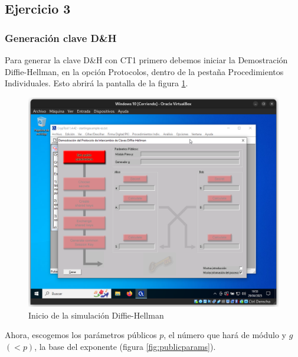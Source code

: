 \subsection{Ejercicio 3}
\graphicspath{ {img/03} }

\subsubsection{Generación clave D\&H}

Para generar la clave D\&H con CT1 primero debemos iniciar la Demostración Diffie-Hellman, en la opción Protocolos, dentro de la pestaña Procedimientos Individuales.
Esto abrirá la pantalla de la figura \ref{fig:inicioD&H}.

\begin{figure}[H]
    \includegraphics[width=\textwidth]{D&H-1.png}
    \caption{Inicio de la simulación Diffie-Hellman}
    \label{fig:inicioD&H}
\end{figure}

Ahora, escogemos los parámetros públicos $p$, el número que hará de módulo y $g$ $(<p)$, la base del exponente (figura \ref{fig:publicparams}).

